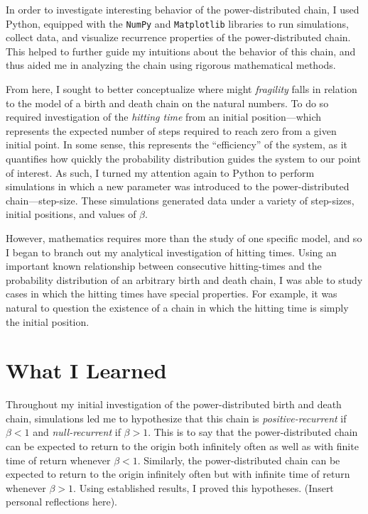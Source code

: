 \documentclass[12pt,letterpaper]{article}
\begin{document}
In order to investigate interesting behavior of the power-distributed chain, I used Python, equipped with
the \texttt{NumPy} and \texttt{Matplotlib} libraries to run simulations, collect data, and visualize
recurrence properties of the power-distributed chain. This helped to further guide my intuitions about
the behavior of this chain, and thus aided me in analyzing the chain using rigorous mathematical
methods.

From here, I sought to better conceptualize where might \emph{fragility} falls in relation to the model
of a birth and death chain on the natural numbers. To do so required investigation of the \emph{hitting
time} from an initial position---which represents the expected number of steps required to reach zero
from a given initial point. In some sense, this represents the ``efficiency'' of the system, as it
quantifies how quickly the probability distribution guides the system to our point of interest. As such,
I turned my attention again to Python to perform simulations in which a new parameter was introduced to
the power-distributed chain---step-size. These simulations generated data under a variety of step-sizes,
initial positions, and values of $\beta$.

However, mathematics requires more than the study of one specific model, and so I began to branch out my
analytical investigation of hitting times. Using an important known relationship between consecutive
hitting-times and the probability distribution of an arbitrary birth and death chain, I was able to
study cases in which the hitting times have special properties. For example, it was natural to question
the existence of a chain in which the hitting time is simply the initial position.

\section*{What I Learned}
Throughout my initial investigation of the power-distributed birth and death chain, simulations led me
to hypothesize that this chain is \emph{positive-recurrent} if $\beta < 1$ and \emph{null-recurrent} if
$\beta > 1$. This is to say that the power-distributed chain can be expected to return to the origin
both infinitely often as well as with finite time of return whenever $\beta < 1$. Similarly, the
power-distributed chain can be expected to return to the origin infinitely often but with infinite time
of return whenever $\beta > 1$. Using established results, I proved this hypotheses. (Insert personal
reflections here).
\end{document}
